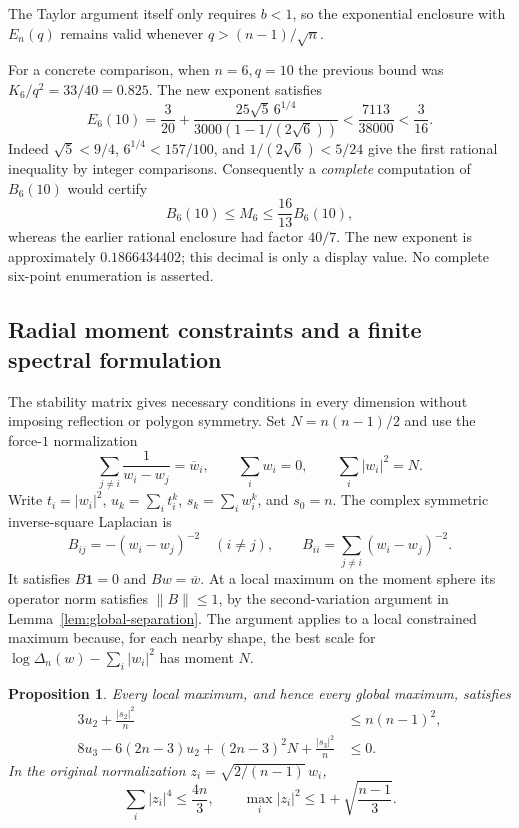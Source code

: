 \documentclass[11pt]{article}
\newtheorem{proposition}[theorem]{Proposition}
\theoremstyle{remark}
\numberwithin{equation}{section}
\begin{document}
The Taylor argument itself only requires $b<1$, so the exponential
enclosure with $E_n(q)$ remains valid whenever $q>(n-1)/\sqrt n$.

For a concrete comparison, when $n=6,q=10$ the previous bound was
$K_6/q^2=33/40=0.825$.  The new exponent satisfies
\[
 E_6(10)=\frac3{20}
 +\frac{25\sqrt5\,6^{1/4}}{3000(1-1/(2\sqrt6))}
 <\frac{7113}{38000}<\frac3{16}.
\]
Indeed $\sqrt5<9/4$, $6^{1/4}<157/100$, and
$1/(2\sqrt6)<5/24$ give the first rational inequality by integer
comparisons.  Consequently a \emph{complete} computation of $B_6(10)$
would certify
\[
 B_6(10)\le M_6\le\frac{16}{13}B_6(10),
\]
whereas the earlier rational enclosure had factor $40/7$.
The new exponent is approximately $0.1866434402$; this decimal is
only a display value.  No complete six-point enumeration is asserted.


\subsection{Radial moment constraints and a finite spectral formulation}

The stability matrix gives necessary conditions in every dimension without
imposing reflection or polygon symmetry.  Set $N=n(n-1)/2$ and use the
force-$1$ normalization
\[
 \sum_{j\ne i}\frac1{w_i-w_j}=\overline w_i,
 \qquad \sum_iw_i=0,\qquad \sum_i|w_i|^2=N.
\]
Write $t_i=|w_i|^2$, $u_k=\sum_i t_i^k$, $s_k=\sum_iw_i^k$,
and $s_0=n$.  The complex symmetric inverse-square Laplacian is
\[
 B_{ij}=-(w_i-w_j)^{-2}\quad(i\ne j),\qquad
 B_{ii}=\sum_{j\ne i}(w_i-w_j)^{-2}.
\]
It satisfies $B\mathbf1=0$ and $Bw=\overline w$.
At a local maximum on the moment sphere its operator norm satisfies
$\|B\|\le1$, by the second-variation argument in
Lemma~\ref{lem:global-separation}.  The argument applies to a local
constrained maximum because, for each nearby shape, the best scale for
$\log\Delta_n(w)-\sum_i|w_i|^2$ has moment $N$.

\begin{proposition}\label{prop:general-radial-stability}
Every local maximum, and hence every global maximum, satisfies
\begin{align}
 3u_2+\frac{|s_2|^2}{n}&\le n(n-1)^2,
 \label{eq:general-fourth-cut}\\
 8u_3-6(2n-3)u_2+(2n-3)^2N+\frac{|s_3|^2}{n}&\le0.
 \label{eq:general-sixth-cut}
\end{align}
In the original normalization $z_i=\sqrt{2/(n-1)}\,w_i$,
\[
 \sum_i|z_i|^4\le\frac{4n}{3},\qquad
 \max_i|z_i|^2\le1+\sqrt{\frac{n-1}{3}}.
\]
\end{proposition}
\end{document}
